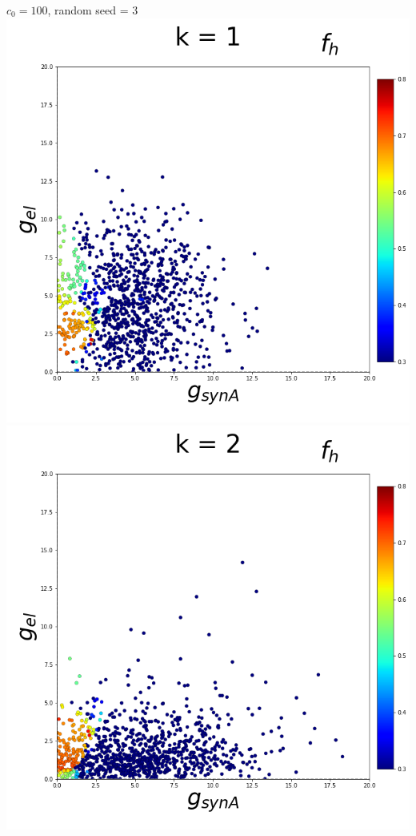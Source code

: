 \documentclass[11pt]{article}
\begin{document}
\begin{center}
{\Large $c_0 = 100$, random seed = 3} \\
\includegraphics[scale=0.125]{DSN_figs/STGCircuit_DSN_c=2_rs=3_k=1.png}
\includegraphics[scale=0.125]{DSN_figs/STGCircuit_DSN_c=2_rs=3_k=2.png}

\end{center}
\end{document}

